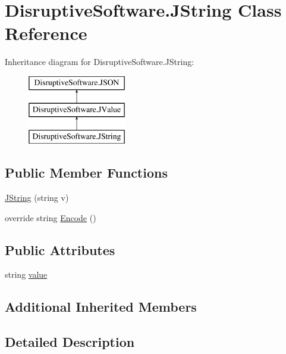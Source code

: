 \hypertarget{class_disruptive_software_1_1_j_string}{\section{Disruptive\+Software.\+J\+String Class Reference}
\label{class_disruptive_software_1_1_j_string}
}
Inheritance diagram for Disruptive\+Software.\+J\+String\+:\begin{figure}[H]
\begin{center}
\leavevmode
\includegraphics[height=3.000000cm]{class_disruptive_software_1_1_j_string}
\end{center}
\end{figure}
\subsection*{Public Member Functions}
\begin{DoxyCompactItemize}
\item 
\hyperlink{class_disruptive_software_1_1_j_string_a729cb4f1190896a3ee89bcd7e424e1ae}{J\+String} (string v)
\item 
override string \hyperlink{class_disruptive_software_1_1_j_string_a10def4d5a8d41e6c706b25c7decbc7bf}{Encode} ()
\end{DoxyCompactItemize}
\subsection*{Public Attributes}
\begin{DoxyCompactItemize}
\item 
string \hyperlink{class_disruptive_software_1_1_j_string_a4cc207c65aecca215478cd28e5632030}{value}
\end{DoxyCompactItemize}
\subsection*{Additional Inherited Members}


\subsection{Detailed Description}



